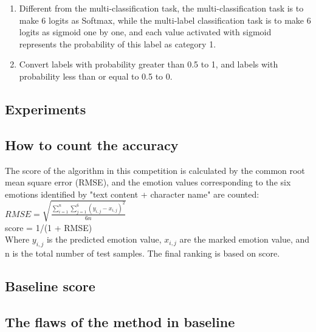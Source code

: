 \documentclass[12pt,twocolumn,letterpaper]{article}
\begin{document}
\begin{enumerate}
\begin{enumerate}
\item Different from the multi-classification task, the multi-classification task is to make 6 logits as Softmax, while the multi-label classification task is to make 6 logits as sigmoid one by one, and each value activated with sigmoid represents the probability of this label as category 1.

\item Convert labels with probability greater than 0.5 to 1, and labels with probability less than or equal to 0.5 to 0.  



\end{enumerate}

\end{enumerate}


\subsection{Experiments}


\subsection{How to count the accuracy}

The score of the algorithm in this competition is calculated by the common root mean square error (RMSE), and the emotion values corresponding to the six emotions identified by "text content + character name" are counted:\\

$R M S E=\sqrt{\frac{\sum_{i=1}^{n} \sum_{j=1}^{6}\left(y_{i, j}-x_{i, j}\right)^{2}}{6 n}}$\\

score = 1/(1 + RMSE)\\

Where $y_{i,j}$ is the predicted emotion value, $x_{i,j}$ are the marked emotion value, and n is the total number of test samples.  
The final ranking is based on score.  

\subsection{Baseline score}

\subsection{The flaws of the method in baseline}
\end{document}
